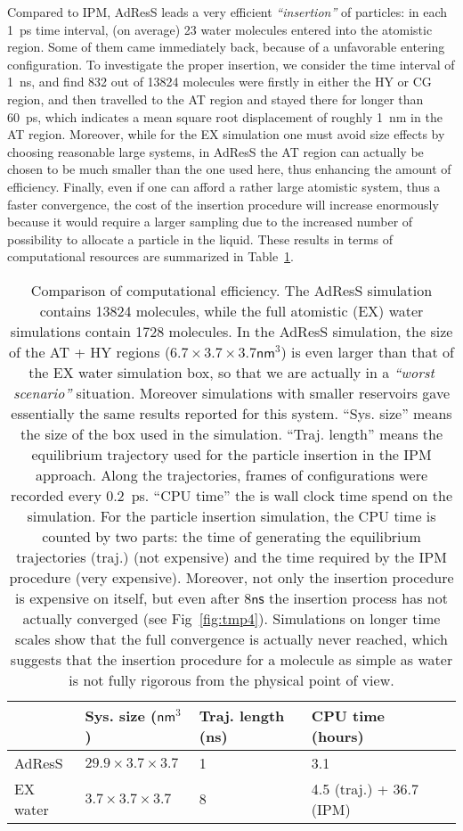 \documentclass[aip,jcp,a4paper,reprint,onecolumn]{revtex4-1}
\newcommand{\redc}[1]{{\color{red} #1}}
\begin{document}
{Compared to IPM, AdResS leads a very
efficient {\it ``insertion''} of particles: in each 1~\textsf{ps} time interval,
(on average) 23 water molecules entered into the atomistic region. Some of
them came immediately back, because of a unfavorable entering
configuration.  To investigate the proper insertion, we consider the
time interval of 1~\textsf{ns}, and find 832 out of 13824 molecules
were firstly in either the HY or CG region, and then travelled to the
AT region and stayed there for longer than 60~\textsf{ps}, which
indicates a mean square root displacement of roughly 1~\textsf{nm}
in the AT region. Moreover, while for the EX simulation one must avoid size effects by choosing reasonable large systems, in AdResS the AT region can actually be chosen to be much smaller than the one used here, thus enhancing the amount of efficiency. Finally, even if one can afford a rather large atomistic system, thus a faster convergence, the cost of the insertion procedure will increase enormously because it would require a larger sampling due to the increased number of possibility to allocate a particle in the liquid. 
These results in terms of computational resources are summarized in Table~\ref{tab:tmp1}.}
\begin{table}
  \centering
  \begin{tabular}{l|l|l|l|l}
    & Sys. size ($\textsf{nm}^3$)
    & Traj. length (\textsf{ns})
    & CPU time (hours)\\    \hline
    AdResS   &$29.9\times3.7\times3.7$ & 1 & 3.1\\
    EX water & $3.7\times3.7\times3.7$ & 8 & 4.5 (traj.) + 36.7 (IPM)\\
  \end{tabular}
  \caption{\redc{Comparison of computational efficiency.
      The AdResS simulation contains 13824 molecules, while the full atomistic (EX)
      water simulations contain 1728 molecules. In the AdResS simulation,
      the size of the AT + HY regions ($6.7\times3.7\times3.7\textsf{nm}^3$) is even larger than that of the EX water
      simulation box, so that we are actually in a {\it ``worst scenario''} situation. Moreover simulations with smaller reservoirs  gave essentially the same results reported for this system.
      ``Sys. size'' means the size of the box used in the simulation.
      ``Traj. length'' means the equilibrium trajectory
      used for the particle insertion in the IPM approach. Along the trajectories, frames
      of configurations were recorded every 0.2~\textsf{ps}.
      ``CPU time'' the is wall clock time spend on the simulation.
      For the particle insertion simulation, the CPU time is counted by two
      parts: the time of generating the equilibrium trajectories (traj.) (not expensive)
      and the time required by the IPM procedure (very expensive). Moreover, not only the insertion procedure is expensive on itself, but even after $8\textsf{ns}$ the insertion process has not actually converged (see Fig~\ref{fig:tmp4}). Simulations on longer time scales show that the full convergence is actually never reached, which suggests that the insertion procedure for a molecule as simple as water is not fully rigorous from the physical point of view.}
    }
  \label{tab:tmp1}
\end{table}
\end{document}
